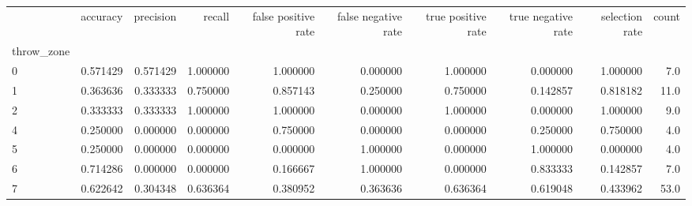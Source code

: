 \begin{tabular}{lrrrrrrrrr}
\toprule
{} &  accuracy &  precision &    recall &  false positive rate &  false negative rate &  true positive rate &  true negative rate &  selection rate &  count \\
throw\_zone &           &            &           &                      &                      &                     &                     &                 &        \\
\midrule
0          &  0.571429 &   0.571429 &  1.000000 &             1.000000 &             0.000000 &            1.000000 &            0.000000 &        1.000000 &    7.0 \\
1          &  0.363636 &   0.333333 &  0.750000 &             0.857143 &             0.250000 &            0.750000 &            0.142857 &        0.818182 &   11.0 \\
2          &  0.333333 &   0.333333 &  1.000000 &             1.000000 &             0.000000 &            1.000000 &            0.000000 &        1.000000 &    9.0 \\
4          &  0.250000 &   0.000000 &  0.000000 &             0.750000 &             0.000000 &            0.000000 &            0.250000 &        0.750000 &    4.0 \\
5          &  0.250000 &   0.000000 &  0.000000 &             0.000000 &             1.000000 &            0.000000 &            1.000000 &        0.000000 &    4.0 \\
6          &  0.714286 &   0.000000 &  0.000000 &             0.166667 &             1.000000 &            0.000000 &            0.833333 &        0.142857 &    7.0 \\
7          &  0.622642 &   0.304348 &  0.636364 &             0.380952 &             0.363636 &            0.636364 &            0.619048 &        0.433962 &   53.0 \\
\bottomrule
\end{tabular}
